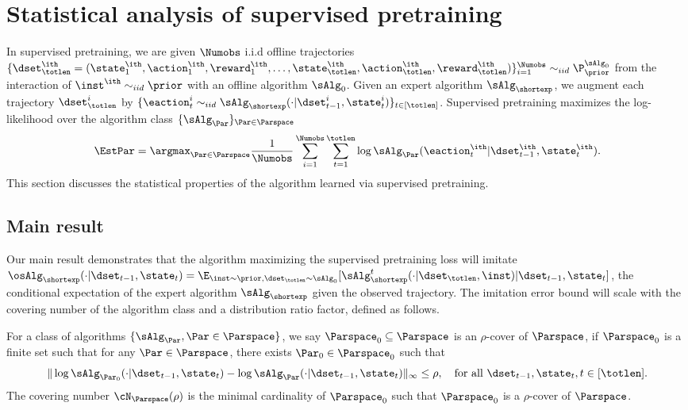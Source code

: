 \documentclass[10pt]{article}
\begin{document}
\section{Statistical analysis of supervised pretraining}\label{sec:supervised-pretraining}

In supervised pretraining, we are given $\Numobs$ i.i.d offline trajectories $\{\dset^\ith_\totlen =  (\state^\ith_1,\action^\ith_1, \reward^\ith_1, \ldots, \state^\ith_\totlen, \allowbreak \action^\ith_\totlen, \allowbreak\reward^\ith_\totlen) \}_{i=1}^\Numobs \sim_{iid} \P_\prior^{\sAlg_0}$ from the interaction of $\inst^\ith \sim_{iid} \prior$ with an offline algorithm $\sAlg_0$. Given an expert algorithm $\sAlg_{\shortexp}$, we augment each trajectory $\dset_{\totlen}^i$ by $\{ \eaction_t^i \sim_{iid} \sAlg_{\shortexp}( \cdot |\dset_{t-1}^i, \state_t^i)\}_{t \in [\totlen]}$. Supervised pretraining maximizes the log-likelihood over the algorithm class $\{ \sAlg_\Par\}_{\Par\in\Parspace}$
\begin{align}
\EstPar=\argmax_{\Par\in\Parspace}  \frac{1}{\Numobs}\sum_{i=1}^\Numobs\sum_{t=1}^\totlen\log \sAlg_\Par(\eaction^\ith_{t}|\dset_{t-1}^\ith,\state^\ith_t). \label{eq:general_mle}
\end{align}
This section discusses the statistical properties of the algorithm learned via supervised pretraining.




\subsection{Main result}



Our main result demonstrates that the algorithm maximizing the supervised pretraining loss will imitate $\osAlg_{\shortexp}(\cdot|\dset_{t-1},\state_t) = \E_{\inst\sim \prior,  \dset_{\totlen} \sim \sAlg_0}[\sAlg_{\shortexp}^t(\cdot|\dset_\totlen,\inst)|\dset_{t-1},\state_t]$, the conditional expectation of the expert algorithm $\sAlg_{\shortexp}$ given the observed trajectory. The imitation error bound will scale with the covering number of the algorithm class and a  distribution ratio factor, defined as follows.

\begin{definition}\label{def:cover_number_general} For a class of algorithms $\{\sAlg_\Par,\Par\in\Parspace\}$,
we say $\Parspace_0 \subseteq\Parspace$ is an  $\rho$-cover of $\Parspace$, if $\Parspace_0$ is a finite set such that for any $\Par\in\Parspace$, there exists $\Par_0\in\Parspace_0$ such that
\[
\|\log \sAlg_{\Par_0}(\cdot|\dset_{t-1},\state_t)-\log \sAlg_{\Par}(\cdot|\dset_{t-1},\state_t)\|_{\infty}\leq\rho,~~~ \text{for all } \dset_{t-1},\state_t, t\in[\totlen].
\]
The covering number $\cN_{\Parspace}(\rho)$ is the minimal cardinality of $\Parspace_0$ such that $\Parspace_0$ is a $\rho$-cover of $\Parspace$.
\end{definition}
\end{document}
